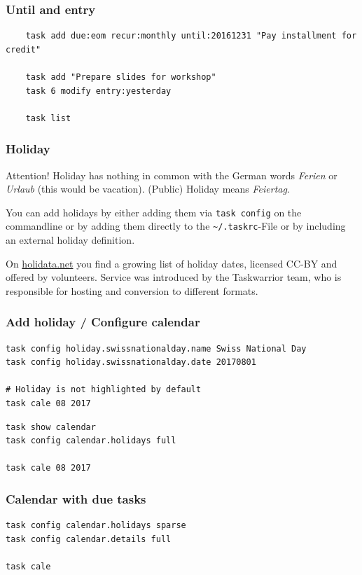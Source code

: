 \documentclass[t,handout]{beamer}
\begin{document}
\begin{frame}[fragile]\frametitle{Until and entry}
    \vfill
    \begin{lstlisting}
    task add due:eom recur:monthly until:20161231 "Pay installment for credit"

    task add "Prepare slides for workshop"
    task 6 modify entry:yesterday

    task list\end{lstlisting}
\end{frame}

\begin{frame}[fragile]\frametitle{Holiday}
    \begin{alertblock}{Attention!}
        Holiday has nothing in common with the German words \textit{Ferien} or \textit{Urlaub} (this would be vacation). (Public) Holiday means \textit{Feiertag}.
    \end{alertblock}

    You can add holidays by either adding them via \verb=task config= on the commandline or by adding them directly to the \verb=~/.taskrc=-File or by including an external holiday definition.

    On \href{http://holidata.net/}{holidata.net} you find a growing list of holiday dates, licensed CC-BY and offered by volunteers. Service was introduced by the Taskwarrior team, who is responsible for hosting and conversion to different formats.
\end{frame}

\begin{frame}[fragile]\frametitle{Add holiday / Configure calendar}
    \vfill
    \begin{lstlisting}
task config holiday.swissnationalday.name Swiss National Day
task config holiday.swissnationalday.date 20170801

# Holiday is not highlighted by default
task cale 08 2017\end{lstlisting}

    \begin{lstlisting}
task show calendar
task config calendar.holidays full

task cale 08 2017\end{lstlisting}
\end{frame}


\begin{frame}[fragile]\frametitle{Calendar with due tasks}
    \vfill
    \begin{lstlisting}
task config calendar.holidays sparse
task config calendar.details full

task cale\end{lstlisting}
\end{frame}
\end{document}
